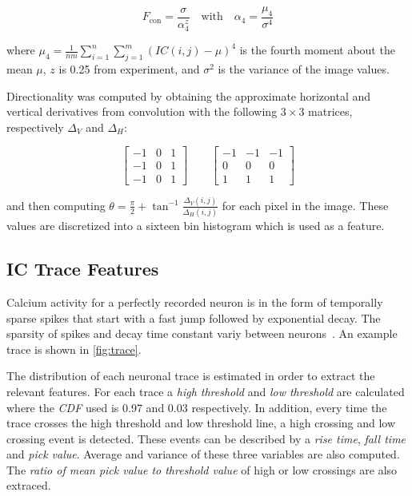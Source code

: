 \documentclass[10pt]{article}
\begin{document}
$$
F_\text{con} = \frac{\sigma}{\alpha_4^z} \quad \text{with} \quad \alpha_4 = \frac{\mu_4}{\sigma^4}
$$

\noindent
where $\mu_4 = \frac{1}{nm} \sum_{i=1}^n \sum_{j=1}^m (IC(i,j)-\mu)^4$
is the fourth moment about the mean $\mu$, $z$ is \num{0.25} from experiment, and $\sigma^2$ is the variance of the image values.

Directionality was computed by obtaining the approximate horizontal and vertical derivatives from convolution with the following $3\times3$ matrices, respectively $\Delta_V$ and $\Delta_H$:

$$
\begin{bmatrix}
-1 & 0 & 1 \\ -1 & 0 & 1 \\ -1 & 0 & 1
\end{bmatrix} \qquad
\begin{bmatrix}
-1 & -1 & -1 \\
0 & 0 & 0 \\
1 & 1 & 1
\end{bmatrix}
$$

\noindent
and then computing $\theta = \frac{\pi}{2} + \tan^{-1}\frac{\Delta_V(i,j)}{\Delta_H(i,j)}$ for each pixel in the image.
These values are discretized into a sixteen bin histogram which is used as a feature.

\subsection{IC Trace Features}

Calcium activity for a perfectly recorded neuron is in the form of temporally sparse spikes that start with a fast jump followed by exponential decay. The sparsity of spikes and decay time constant variy between neurons~\cite{Mukamel2009}. 
An example trace is shown in \cref{fig:trace}.

The distribution of each neuronal trace is estimated in order to extract the relevant features. For each trace a \emph{high threshold} and \emph{low threshold} are calculated where the \emph{CDF} used is \num{0.97} and \num{0.03} respectively. In addition, every time the trace crosses the high threshold and low threshold line, a high crossing and low crossing event is detected. These events can be described by a \emph{rise time}, \emph{fall time} and \emph{pick value}. Average and variance of these three variables are also computed. The \emph{ratio of mean pick value to threshold value} of high or low crossings are also extraced.
\end{document}
